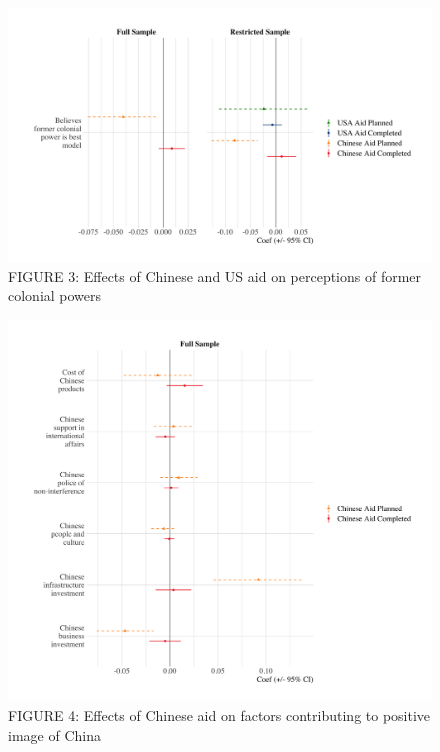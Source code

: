 \documentclass[9pt]{article}
\begin{document}
\begin{figure}[H]
\centering
\includegraphics[width=1\textwidth]{figures/figure_03.png}
\caption{FIGURE 3: Effects of Chinese and US aid on perceptions of former colonial powers}
\end{figure}

\begin{figure}[H]
\centering
\includegraphics[width=1\textwidth]{figures/figure_04.png}
\caption{FIGURE 4: Effects of Chinese aid on factors contributing to positive image of China}
\end{figure}
\end{document}
